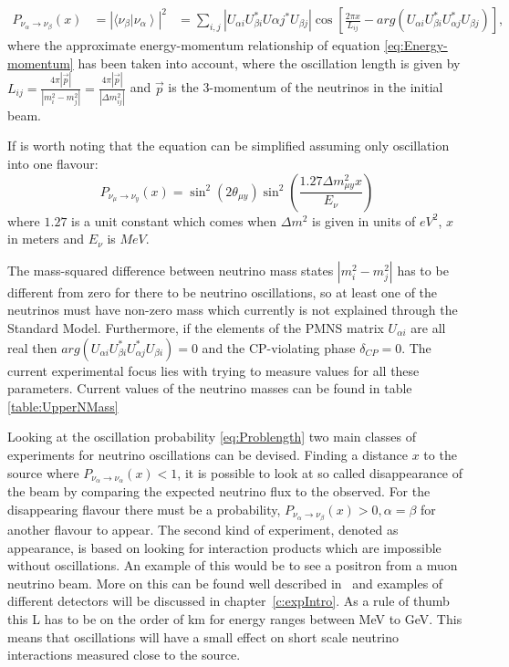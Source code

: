 \begin{equation}
\label{eq:Problength}
\begin{aligned}
P_{\nu_\alpha \rightarrow \nu_\beta} (x) &= \left|  \langle \nu_\beta \left| \nu_\alpha     \right\rangle  \right|^2
& = \sum_{i,j} \left| U_{\alpha i} U_{\beta i}^* U{\alpha j}^* U_{\beta j} \right| \cos\left[\frac{2\pi x}{L_{ij}} -arg(U_{\alpha i} U_{\beta i}^* U_{\alpha j}^* U_{\beta j} ) \right],
\end{aligned}
\end{equation}
where the approximate energy-momentum relationship of equation \ref{eq:Energy-momentum} has been taken into account, where the oscillation length is given by $L_{ij} = \frac{4\pi  \left| \vec{p} \right| }{\left| m_i^2 - m_j^2 \right|}=\frac{4\pi  \left| \vec{p} \right| }{\left| \Delta m_{ij}^2 \right|} $ and $\vec{p}$ is the 3-momentum of the neutrinos in the initial beam.

If is worth noting that the equation can be simplified assuming only oscillation into one flavour:
\begin{equation}
P_{\nu_\mu \rightarrow \nu_y} (x) = \sin^2(2\theta_{\mu y})\sin^2 \left( \frac{1.27\Delta m_{\mu y}^2 x}{E_\nu} \right)
\label{eq:twoPNeutrinoosc}
\end{equation}
where $1.27$ is a unit constant which comes when $\Delta m^2$ is given in units of $eV^2$, $x$ in meters and $E_\nu$ is $MeV$.

The mass-squared difference between neutrino mass states $\left|m_i^2 - m_j^2\right|$ has to be different from zero for there to be neutrino oscillations, so at least one of the neutrinos must have non-zero mass which currently is not explained through the Standard Model. Furthermore, if the elements of the PMNS matrix $U_{\alpha i}$ are all real then $arg(U_{\alpha i} U^*_{\beta i} U^*_{\alpha j}  U_{\beta i} ) = 0$ and the CP-violating phase $\delta_{CP} =0$. The current experimental focus lies with trying to measure values for all these parameters. Current values of the neutrino masses can be found in table \ref{table:UpperNMass}

Looking at the oscillation probability \eqref{eq:Problength} two main classes of experiments for neutrino oscillations can be devised. Finding a distance $x$ to the source where $P_{\nu_\alpha \rightarrow \nu_\alpha} (x) < 1$, it is possible to look at so called disappearance of the beam by comparing the expected neutrino flux to the observed. For the disappearing flavour there must be a probability, $P_{\nu_\alpha \rightarrow \nu_\beta} (x) > 0, \alpha=\beta$ for another flavour to appear. The second kind of experiment, denoted as appearance, is based on looking for interaction products which are impossible without oscillations.  An example of this would be to see a positron from a muon neutrino beam. More on this can be found well described in~\cite{34doi:10.1142/9789812562203_0002} and examples of different detectors will be discussed in chapter~\ref{c:expIntro}. As a rule of thumb this L has to be on the order of km for energy ranges between MeV to GeV. This means that oscillations will have a small effect on short scale neutrino interactions measured close to the source.

